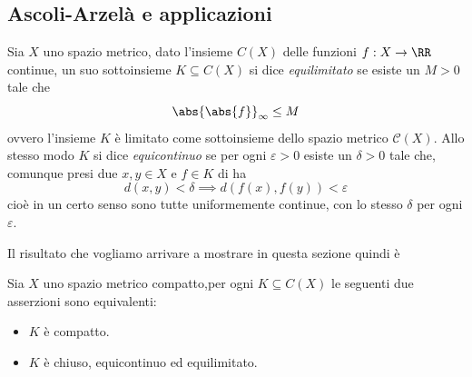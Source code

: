 \documentclass[11pt]{scrartcl}
\begin{document}
	\subsection{Ascoli-Arzelà e applicazioni}
	\begin{definition}
		Sia $X$ uno spazio metrico, dato l'insieme $C(X)$ delle funzioni $f:X\to\RR$ continue, un suo sottoinsieme $K\subseteq C(X)$ si dice \textit{equilimitato} se esiste un $M>0$ tale che
		$$\abs{\abs{f}}_\infty\le M$$
		ovvero l'insieme $K$ è limitato come sottoinsieme dello spazio metrico $\mathcal{C}(X)$. Allo stesso modo $K$ si dice \textit{equicontinuo} se per ogni $\varepsilon>0$ esiste un $\delta>0$ tale che, comunque presi due $x,y\in X$ e $f\in K$ di ha
		$$d(x,y)<\delta \implies d\left(f(x),f(y)\right)<\varepsilon$$
		cioè in un certo senso sono tutte uniformemente continue, con lo stesso $\delta$ per ogni $\varepsilon$.
	\end{definition}
	Il risultato che vogliamo arrivare a mostrare in questa sezione quindi è 
	\begin{theorem}
		Sia $X$ uno spazio metrico compatto,per ogni $K\subseteq C(X)$ le seguenti due asserzioni sono equivalenti:
		\begin{itemize}
			\item[A:] $K$ è compatto.
			\item[B:] $K$ è chiuso, equicontinuo ed equilimitato.
		\end{itemize}
	\end{theorem}
\end{document}
